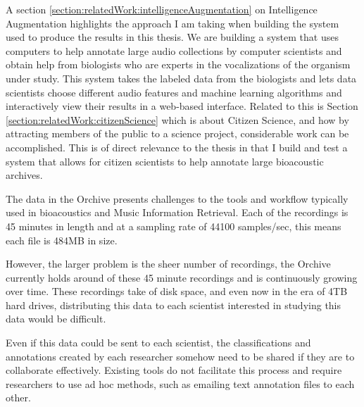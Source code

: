 \documentclass[12pt,oneside]{book}
\begin{document}
A section \ref{section:relatedWork:intelligenceAugmentation} on
Intelligence Augmentation highlights the approach I am taking when
building the system used to produce the results in this thesis.  We
are building a system that uses computers to help annotate large audio
collections by computer scientists and obtain help from biologists who
are experts in the vocalizations of the organism under study.  This
system takes the labeled data from the biologists and lets data
scientists choose different audio features and machine learning
algorithms and interactively view their results in a web-based
interface.  Related to this is Section
\ref{section:relatedWork:citizenScience} which is about Citizen
Science, and how by attracting members of the public to a science
project, considerable work can be accomplished.  This is of direct
relevance to the thesis in that I build and test a system that allows
for citizen scientists to help annotate large bioacoustic archives.



\label{chap:architecture}

The data in the Orchive presents challenges to the tools and workflow
typically used in bioacoustics and Music Information Retrieval.  Each
of the recordings is 45 minutes in length and at a sampling rate of
44100 samples/sec, this means each file is 484MB in size.

However, the larger problem is the sheer number of recordings, the
Orchive currently holds around \totalNumberOfOrchiveRecordings of
these 45 minute recordings and is continuously growing over time.
These recordings take \diskSpaceOrchive of disk space, and even now in
the era of 4TB hard drives, distributing this data to each scientist
interested in studying this data would be difficult.

Even if this data could be sent to each scientist, the classifications
and annotations created by each researcher somehow need to be shared
if they are to collaborate effectively.  Existing tools do not
facilitate this process and require researchers to use ad hoc
methods, such as emailing text annotation files to each other.
\end{document}
